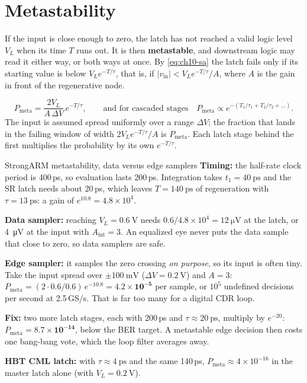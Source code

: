 \section{Metastability}\label{sec:metastability}

If the input is close enough to zero, the latch has not reached a valid logic level $V_L$ when its time $T$ runs out. It is then \textbf{metastable}, and downstream logic may read it either way, or both ways at once. By \cref{eq:ch10-sa} the latch fails only if its starting value is below $V_Le^{-T/\tau}$, that is, if $\lvert v_\mathrm{in}\rvert<V_Le^{-T/\tau}/A$, where $A$ is the gain in front of the regenerative node.

\begin{keyeq}
\begin{equation}
  P_\mathrm{meta}=\frac{2V_L}{A\,\Delta V}\,e^{-T/\tau},\qquad\text{and for cascaded stages}\quad P_\mathrm{meta}\propto e^{-(T_1/\tau_1+T_2/\tau_2+\dots)} .
  \label{eq:ch10-meta}
\end{equation}
The input is assumed spread uniformly over a range $\Delta V$; the fraction that lands in the failing window of width $2V_Le^{-T/\tau}/A$ is $P_\mathrm{meta}$. Each latch stage behind the first multiplies the probability by its own $e^{-T/\tau}$.
\end{keyeq}

\begin{example}{StrongARM metastability, data versus edge samplers}\label{we:ch10-meta}
\textbf{Timing:} the half-rate clock period is 400\,ps, so evaluation lasts 200\,ps. Integration takes $t_1=\qty{40}{\pico\second}$ and the SR latch needs about 20\,ps, which leaves $T=\qty{140}{\pico\second}$ of regeneration with $\tau=\qty{13}{\pico\second}$: a gain of $e^{10.8}=4.8\times10^4$.

\textbf{Data sampler:} reaching $V_L=\qty{0.6}{\volt}$ needs $0.6/4.8\times10^4=\qty{12}{\micro\volt}$ at the latch, or \qty{4}{\micro\volt} at the input with $A_\mathrm{int}=3$. An equalized eye never puts the data sample that close to zero, so data samplers are safe.

\textbf{Edge sampler:} it samples the zero crossing \emph{on purpose}, so its input is often tiny. Take the input spread over $\pm\qty{100}{\milli\volt}$ ($\Delta V=\qty{0.2}{\volt}$) and $A=3$: $P_\mathrm{meta}=(2\cdot0.6/0.6)\,e^{-10.8}=\mathbf{4.2\times10^{-5}}$ per sample, or $10^5$ undefined decisions per second at 2.5\,GS/s. That is far too many for a digital CDR loop.

\textbf{Fix:} two more latch stages, each with 200\,ps and $\tau\approx\qty{20}{\pico\second}$, multiply by $e^{-20}$: $P_\mathrm{meta}=\mathbf{8.7\times10^{-14}}$, below the BER target. A metastable edge decision then costs one bang-bang vote, which the loop filter averages away.

\textbf{HBT CML latch:} with $\tau\approx\qty{4}{\pico\second}$ and the same 140\,ps, $P_\mathrm{meta}\approx4\times10^{-16}$ in the master latch alone (with $V_L=\qty{0.2}{\volt}$).
\end{example}

